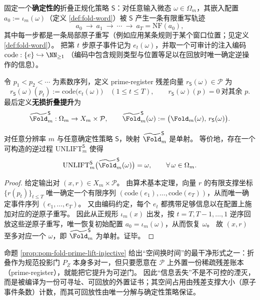 \begin{definition}\label{def:pom-fold-prime-lift}
固定一个\textbf{确定性的}折叠正规化策略 \(\mathsf{S}\)：对任意输入微态 \(\omega\in\Omega_m\)，其嵌入配置 \(a_0:=\iota_m(\omega)\)（定义 \ref{def:fold-word}）被 \(\mathsf{S}\) 产生一条有限重写轨迹
\[
a_0\ \to\ a_1\ \to\ \cdots\ \to\ a_T=\mathrm{NF}(a_0),
\]
其中每一步都是一条局部原子重写（例如应用某条规则于某个窗口位置；见定义 \ref{def:fold-word}）。
把第 \(t\) 步原子事件记为 \(e_t(\omega)\)，并取一个可审计的注入编码
\(
\mathrm{code}:\{e\}\hookrightarrow\NN_{\ge 1}
\)
（编码中包含规则类型与位置等足以在回放时唯一确定逆操作的信息）。
\par
令 \(p_1<p_2<\cdots\) 为素数序列，定义 prime-register 残差向量 \(r_{\mathsf S}(\omega)\in\mathcal P\) 为
\[
r_{\mathsf S}(\omega)(p_t):=\mathrm{code}\bigl(e_t(\omega)\bigr)\quad(1\le t\le T),
\qquad
r_{\mathsf S}(\omega)(p)=0\ \text{对其余 }p.
\]
最后定义\textbf{无损折叠提升}为
\[
\widetilde{\Fold}^{\mathsf S}_m:\Omega_m\to X_m\times\mathcal P,
\qquad
\widetilde{\Fold}^{\mathsf S}_m(\omega):=\bigl(\Fold_m(\omega),\,r_{\mathsf S}(\omega)\bigr).
\]
\end{definition}

\begin{proposition}\label{prop:pom-fold-prime-lift-injective}
对任意分辨率 \(m\) 与任意确定性策略 \(\mathsf S\)，映射 \(\widetilde{\Fold}^{\mathsf S}_m\) 是单射。
等价地，存在一个可构造的逆过程 \(\mathrm{UNLIFT}^{\mathsf S}_m\) 使得
\[
\mathrm{UNLIFT}^{\mathsf S}_m\bigl(\widetilde{\Fold}^{\mathsf S}_m(\omega)\bigr)=\omega,\qquad \forall\,\omega\in\Omega_m.
\]
\end{proposition}
\begin{proof}
给定输出对 \((x,r)\in X_m\times\mathcal P\)。
由算术基本定理，向量 \(r\) 的有限支撑坐标 \(\{r(p_t)\}_{t\le T}\) 唯一确定一个有限序列 \((\mathrm{code}(e_1),\dots,\mathrm{code}(e_T))\)，从而唯一确定事件序列 \((e_1,\dots,e_T)\)。
又由编码约定，每个 \(e_t\) 都携带足够信息以在配置上施加对应的逆原子重写。
因此从正规形 \(\iota_m(x)\) 出发，按 \(t=T,T{-}1,\dots,1\) 逆序回放这些逆原子重写，唯一恢复初始配置 \(a_0=\iota_m(\omega)\)，从而恢复 \(\omega\)。
故 \((x,r)\) 至多对应一个 \(\omega\)，即 \(\widetilde{\Fold}^{\mathsf S}_m\) 为单射。证毕。
\end{proof}\begin{remark}\label{rem:pom-fold-lossless}
命题 \ref{prop:pom-fold-prime-lift-injective} 给出“空间换时间”的最干净形式之一：折叠作为规范投影门 \(P_Z\) 本身多对一，但只要愿意在 \(\mathcal P\) 上外置一份稀疏残差账本（prime-register），就能把它提升为可逆门。
因此“信息丢失”不是不可控的湮灭，而是被编译为一份可寻址、可回放的外置证书；其空间占用由残差支撑大小（原子事件条数）计数，而其可回放性由唯一分解与确定性策略保证。
\end{remark}

